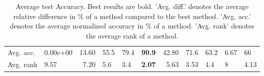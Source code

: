 \begin{table}[ht!]
\begin{tabular}{llrlllrllll}
  Avg. acc. & 0.00e+00 & 13.60 & 55.5 & 79.4 & \textbf{90.9} & 42.80 & 71.6 & 63.2 & 6.67 & 66 \\ 
  Avg. rank & 9.57 & 7.20 & 5.6 & 3.4 & \textbf{2.07} & 5.63 & 3.53 & 4.4 & 8 & 4.13 \\ 
   \hline
\hline
\end{tabular}
\endgroup
\caption{Average test Accuracy. 
                  Best results are bold. 
                  'Avg. diff.' denotes the average relative difference in \% of a method compared to the best method.
                  'Avg. acc.' denotes the average normalized accuracy in \% of a method.
                  'Avg. rank' denotes the average rank of a method.} 
\label{TABLES/table_results_Accuracy_mahalanobis}
\end{table}
